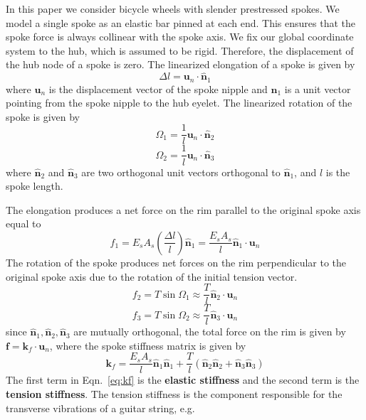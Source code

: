 \documentclass{bmd2016p}
\begin{document}
In this paper we consider bicycle wheels with slender prestressed spokes. We model a single spoke as an elastic bar pinned at each end. This ensures that the spoke force is always collinear with the spoke axis. We fix our global coordinate system to the hub, which is assumed to be rigid. Therefore, the displacement of the hub node of a spoke is zero. The linearized elongation of a spoke is given by
	\begin{equation}\label{eq:selong}
	\Delta l = \bm{u}_n\cdot \hat{\bm{n}}_1
	\end{equation}
where $\bm{u}_n$ is the displacement vector of the spoke nipple and $\hat{\bm{n}}_1$ is a unit vector pointing from the spoke nipple to the hub eyelet. The linearized rotation of the spoke is given by
	\begin{equation}\label{eq:srot1}
	\Omega_1 = \frac{1}{l} \bm{u}_n\cdot \hat{\bm{n}}_2
	\end{equation}
	\begin{equation}\label{eq:srot2}
	\Omega_2 = \frac{1}{l} \bm{u}_n\cdot \hat{\bm{n}}_3
	\end{equation}
where $\hat{\bm{n}}_2$ and $\hat{\bm{n}}_3$ are two orthogonal unit vectors orthogonal to $\hat{\bm{n}}_1$, and $l$ is the spoke length.

The elongation produces a net force on the rim parallel to the original spoke axis equal to
	\begin{equation}\label{eq:sF1}
	f_1 = E_sA_s\left(\frac{\Delta l}{l}\right)\hat{\bm{n}}_1 = \frac{E_sA_s}{l} \hat{\bm{n}}_1 \cdot \bm{u}_n 
	\end{equation}
The rotation of the spoke produces net forces on the rim perpendicular to the original spoke axis due to the rotation of the initial tension vector.
	\begin{equation}\label{eq:sF2}
	f_2 = T \sin{\Omega_1} \approx \frac{T}{l} \hat{\bm{n}}_2 \cdot \bm{u}_n
	\end{equation}
	\begin{equation}\label{eq:sF3}
	f_3 = T \sin{\Omega_2} \approx \frac{T}{l} \hat{\bm{n}}_3 \cdot \bm{u}_n
	\end{equation}
since $\hat{\bm{n}}_1,\hat{\bm{n}}_2,\hat{\bm{n}}_3$ are mutually orthogonal, the total force on the rim is given by $\bm{f} = \bm{k}_f \cdot \bm{u}_n$, where the spoke stiffness matrix is given by
	\begin{equation}\label{eq:kf}
	\bm{k}_f = \frac{E_sA_s}{l}\hat{\bm{n}}_1\hat{\bm{n}}_1 + \frac{T}{l}(\hat{\bm{n}}_2\hat{\bm{n}}_2 + \hat{\bm{n}}_3\hat{\bm{n}}_3)
	\end{equation}
The first term in Eqn.~\ref{eq:kf} is the {\bf elastic stiffness} and the second term is the {\bf tension stiffness}. The tension stiffness is the component responsible for the transverse vibrations of a guitar string, e.g.
\end{document}
